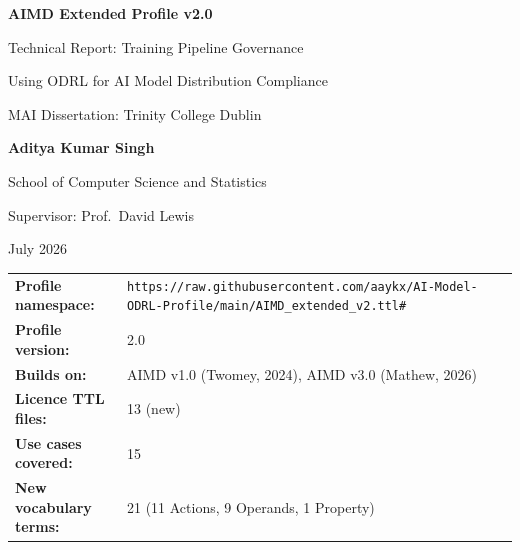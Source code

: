 \documentclass[12pt,a4paper]{article}
\begin{document}
\begin{titlepage}
  \centering
  \vspace*{2cm}
  {\Huge\bfseries AIMD Extended Profile v2.0\par}
  \vspace{0.4cm}
  {\LARGE Technical Report: Training Pipeline Governance\par}
  \vspace{0.3cm}
  {\Large Using ODRL for AI Model Distribution Compliance\par}
  \vspace{2cm}
  {\large MAI Dissertation: Trinity College Dublin\par}
  \vspace{0.3cm}
  {\Large\bfseries Aditya Kumar Singh\par}
  \vspace{0.2cm}
  {\large School of Computer Science and Statistics\par}
  \vspace{0.2cm}
  {\large Supervisor: Prof.\ David Lewis\par}
  \vspace{1.5cm}
  {\large July 2026\par}
  \vfill
  \begin{tabular}{ll}
    \textbf{Profile namespace:} & \texttt{https://raw.githubusercontent.com/aaykx/AI-Model-ODRL-Profile/main/AIMD_extended_v2.ttl#} \\
    \textbf{Profile version:}   & 2.0 \\
    \textbf{Builds on:}         & AIMD v1.0 (Twomey, 2024), AIMD v3.0 (Mathew, 2026) \\
    \textbf{Licence TTL files:} & 13 (new) \\
    \textbf{Use cases covered:} & 15 \\
    \textbf{New vocabulary terms:} & 21 (11 Actions, 9 Operands, 1 Property) \\
  \end{tabular}
\end{titlepage}

\tableofcontents
\newpage
\end{document}
